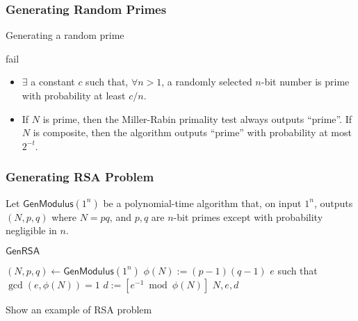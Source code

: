 \begin{comment}
Use extended Euclidean algorithm, $3\cdot 5-2\cdot 7 =1$.\\
$1_p = [(-2\cdot 7) \bmod 35]=21$ and $1_q = [3\cdot 5 \bmod 35] = 15$.\\
$(4,3) \leftrightarrow [4\cdot 1_p + 3\cdot 1_q \bmod 35] = 24$.
\end{exampleblock}
\begin{exampleblock}{Compute $[29^{100} \bmod 35]$}
$29 \leftrightarrow ([1 \bmod 5],[-1 \bmod 7])$, $[29^{100} \bmod 35] \leftrightarrow (1,-1)^{100} = (1,1) \leftrightarrow 1$.
\end{exampleblock}
\end{frame}
\end{comment}
\begin{frame}\frametitle{Generating Random Primes}
\begin{algorithm}[H]
\DontPrintSemicolon
\caption{Generating a random prime}
\BlankLine
{}
\Return fail
\end{algorithm}
\begin{itemize}
\item $\exists$ a constant $c$ such that, $\forall n>1$, a randomly selected $n$-bit number is prime with probability at least $c/n$.
\item If $N$ is prime, then the Miller-Rabin primality test always outputs ``prime''. If $N$ is composite, then the algorithm outputs ``prime'' with probability at most $2^{-t}$.
\end{itemize}
\end{frame}
\begin{frame}\frametitle{Generating RSA Problem}
Let $\mathsf{GenModulus}(1^n)$ be a polynomial-time algorithm that, on input $1^n$, outputs $(N,p,q)$ where $N=pq$, and $p,q$ are $n$-bit primes except with probability negligible in $n$.
\begin{algorithm}[H]
\DontPrintSemicolon
\caption{$\mathsf{GenRSA}$}
\BlankLine
$(N,p,q) \gets \mathsf{GenModulus}(1^n)$\;
$\phi(N) := (p-1)(q-1)$\;
\KwF $e$ such that $\gcd(e,\phi(N))=1$\;
\KwC $d := [e^{-1} \bmod \phi(N)]$\;
\Return $N,e,d$\;
\end{algorithm}
\begin{exampleblock}{Show an example of RSA problem}
\end{exampleblock}
\end{frame}
